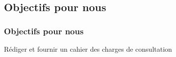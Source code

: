 \subsection{Objectifs pour nous}

\begin{frame}
	\frametitle{Objectifs pour nous}
	\begin{block}{}
		Rédiger et fournir un cahier des charges de consultation 
	\end{block}
\end{frame}

